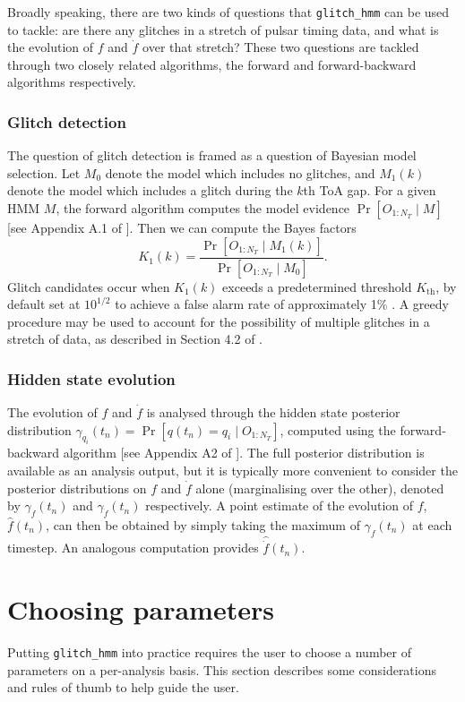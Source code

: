 \documentclass{article}
\newcommand{\glitchhmm}{\texttt{glitch\_hmm}}
\begin{document}
Broadly speaking, there are two kinds of questions that \glitchhmm{} can be used to tackle: are there any glitches in a stretch of pulsar timing data, and what is the evolution of $f$ and $\dot{f}$ over that stretch?
These two questions are tackled through two closely related algorithms, the forward and forward-backward algorithms respectively.

\subsubsection{Glitch detection}
\label{subsec:glitch_det}
The question of glitch detection is framed as a question of Bayesian model selection.
Let $M_0$ denote the model which includes no glitches, and $M_1(k)$ denote the model which includes a glitch during the $k$th ToA gap.
For a given HMM $M$, the forward algorithm computes the model evidence $\Pr[O_{1:N_T} \mid M]$ [see Appendix A.1 of \citet{MelatosDunn2020}].
Then we can compute the Bayes factors \begin{equation} K_1(k) = \frac{\Pr[O_{1:N_T} \mid M_1(k)]}{\Pr[O_{1:N_T} \mid M_0]}. \end{equation}
Glitch candidates occur when $K_1(k)$ exceeds a predetermined threshold $K_\text{th}$, by default set at $10^{1/2}$ to achieve a false alarm rate of approximately 1\% \citep{MelatosDunn2020}.
A greedy procedure may be used to account for the possibility of multiple glitches in a stretch of data, as described in Section 4.2 of \citet{MelatosDunn2020}.

\subsubsection{Hidden state evolution}
\label{subsec:hidden_evo}
The evolution of $f$ and $\dot{f}$ is analysed through the hidden state posterior distribution $\gamma_{q_i}(t_n) = \Pr[q(t_n) = q_i \mid O_{1:N_T}]$, computed using the forward-backward algorithm [see Appendix A2 of \citet{MelatosDunn2020}].
The full posterior distribution is available as an analysis output, but it is typically more convenient to consider the posterior distributions on $f$ and $\dot{f}$ alone (marginalising over the other), denoted by $\gamma_f(t_n)$ and $\gamma_{\dot{f}}(t_n)$ respectively.
A point estimate of the evolution of $f$, $\hat{f}(t_n)$, can then be obtained by simply taking the maximum of $\gamma_f(t_n)$ at each timestep.
An analogous computation provides $\hat{\dot{f}}(t_n)$.

\section{Choosing parameters}
Putting \glitchhmm{} into practice requires the user to choose a number of parameters on a per-analysis basis.
This section describes some considerations and rules of thumb to help guide the user.
\end{document}
